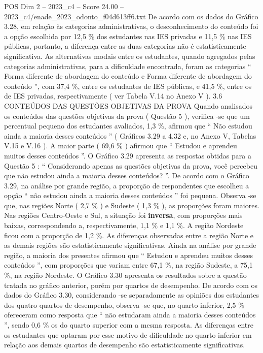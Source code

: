 \begin{textsample}{POS Dim 2 – 2023\_c4 – Score 24.00 – 2023\_c4/enade\_2023\_odonto\_f04d613ff6.txt}
De acordo com os dados do Gráfico 3.28, em relação às categorias administrativas, o desconhecimento do conteúdo foi a opção escolhida por 12,5 \% dos estudantes nas IES privadas e 11,5 \% nas IES públicas, portanto, a diferença entre as duas categorias não é estatisticamente significativa.
As alternativas modais entre os estudantes, quando agregados pelas categorias administrativas, para a dificuldade encontrada, foram as categorias “ Forma diferente de abordagem do conteúdo e Forma diferente de abordagem do conteúdo ”, com 37,4 \%, entre os estudantes de IES públicas, e 41,5 \%, entre os de IES privadas, respectivamente ( ver Tabela V.14 no Anexo V ). 3.6 CONTEÚDOS DAS QUESTÕES OBJETIVAS DA PROVA Quando analisados os conteúdos das questões objetivas da prova ( Questão 5 ), verifica -se que um percentual pequeno dos estudantes avaliados, 1,3 \%, afirmou que “ Não estudou ainda a maioria desses conteúdos ” ( Gráficos 3.29 a 4.32 e, no Anexo V, Tabelas V.15 e V.16 ).
A maior parte ( 69,6 \% ) afirmou que “ Estudou e aprendeu muitos desses conteúdos ”.
O Gráfico 3.29 apresenta as respostas obtidas para a Questão 5 : “ Considerando apenas as questões objetivas da prova, você percebeu que não estudou ainda a maioria desses conteúdos? ”.
De acordo com o Gráfico 3.29, na análise por grande região, a proporção de respondentes que escolheu a opção “ não estudou ainda a maioria desses conteúdos ” foi pequena.
Observa -se que, nas regiões Norte ( 2,7 \% ) e Sudeste ( 1,3 \% ), as proporções foram maiores.
Nas regiões Centro-Oeste e Sul, a situação foi \textbf{inversa}, com proporções mais baixas, correspondendo a, respectivamente, 1,1 \% e 1,1 \%.
A região Nordeste ficou com a proporção de 1,2 \%.
As diferenças observadas entre a região Norte e as demais regiões são estatisticamente significativas.
Ainda na análise por grande região, a maioria dos presentes afirmou que “ Estudou e aprendeu muitos desses conteúdos ”, com proporções que variam entre 67,1 \%, na região Sudeste, a 75,1 \%, na região Nordeste.
O Gráfico 3.30 apresenta os resultados sobre a questão tratada no gráfico anterior, porém por quartos de desempenho.
De acordo com os dados do Gráfico 3.30, considerando -se separadamente as opiniões dos estudantes dos quatro quartos de desempenho, observa -se que, no quarto inferior, 2,5 \% ofereceram como resposta que “ não estudaram ainda a maioria desses conteúdos ”, sendo 0,6 \% os do quarto superior com a mesma resposta.
As diferenças entre os estudantes que optaram por esse motivo de dificuldade no quarto inferior em relação aos demais quartos de desempenho são estatisticamente significativas.

\end{textsample}
